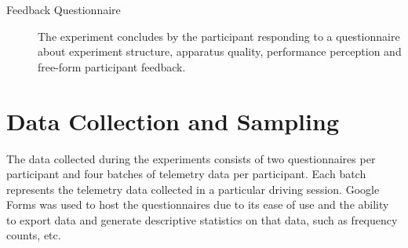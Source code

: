 \begin{description}
	
	\item[Feedback Questionnaire] The experiment concludes by the participant responding to a questionnaire about experiment structure, apparatus quality, performance perception and free-form participant feedback.
	
	
\end{description}

\section{Data Collection and Sampling}
\label{sec:meth-data-gathering}
The data collected during the experiments consists of two questionnaires per participant and four batches of telemetry data per participant. Each batch represents the telemetry data collected in a particular driving session. Google Forms was used to host the questionnaires due to its ease of use and the ability to export data and generate descriptive statistics on that data, such as frequency counts, etc.  


